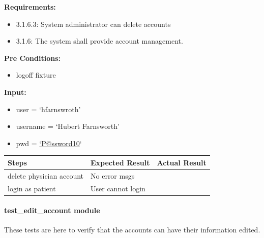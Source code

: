 \documentclass[letterpaper,10pt,english]{sphinxmanual}
\begin{document}
\begin{fulllineitems}
\label{STD/test_create_account:test_create_account.test_delete_physician}
\textbf{Requirements:}
\begin{itemize}
\item {} 
3.1.6.3: System administrator can delete accounts

\item {} 
3.1.6: The system shall provide account management.

\end{itemize}

\textbf{Pre Conditions:}
\begin{itemize}
\item {} 
logoff fixture

\end{itemize}

\textbf{Input:}
\begin{itemize}
\item {} 
user = `hfarnswroth'

\item {} 
username = `Hubert Farnsworth'

\item {} 
pwd = \href{mailto:'P@ssword10}{`P@ssword10}`

\end{itemize}

\begin{tabulary}{\linewidth}{|L|L|L|}
\hline
\textsf{\relax 
Steps
} & \textsf{\relax 
Expected Result
} & \textsf{\relax 
Actual Result
}\\
\hline
delete physician account
 & 
No error msgs
 & \\
\hline
login as patient
 & 
User cannot login
 & \\
\hline\end{tabulary}


\end{fulllineitems}



\paragraph{test\_edit\_account module}
\label{STD/test_edit_account:test-edit-account-module}\label{STD/test_edit_account:module-test_edit_account}\label{STD/test_edit_account::doc}
These tests are here to verify that the accounts can have their information edited.
\end{document}
